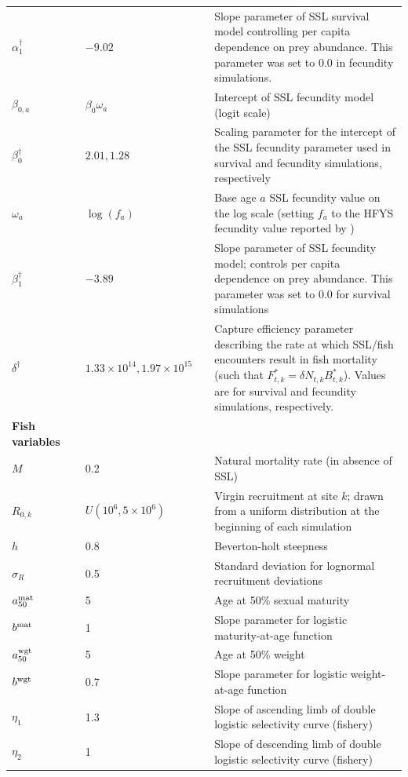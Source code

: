 \documentclass[nonumbib,leqno]{nrc1}
\begin{document}
\begin{longtable}{p{2.5cm}lp{2.5cm}l p{8cm}}
$\alpha_1^\dag$ & & $-9.02$ & & Slope parameter of SSL survival model controlling per capita dependence on prey abundance.  This parameter was set to 0.0 in fecundity simulations. \\
$\beta_{0,a}$ & & $\beta_0 \omega_a$ & & Intercept of SSL fecundity model (logit scale) \\
$\beta_0^\dag$ & & $2.01,1.28$ & & Scaling parameter for the intercept of the SSL fecundity parameter used in survival and fecundity simulations, respectively \\
$\omega_a$ & & $\log(f_a)$ & & Base age $a$ SSL fecundity value on the log scale (setting $f_a$ to the HFYS fecundity value reported by \citet{HolmesEtAl2007}) \\
$\beta_1^\dag$ & & $-3.89$ & & Slope parameter of SSL fecundity model; controls per capita dependence
                    on prey abundance.  This parameter was set to 0.0 for survival simulations \\
$\delta^\dag$ & & $1.33 \times 10^{14}, 1.97 \times 10^{15}  $ & & Capture efficiency parameter describing the rate at which SSL/fish encounters result in fish mortality (such that $F_{t,k}^*=\delta N_{t,k} B_{t,k}^*$).  Values are for survival and fecundity simulations, respectively. \\
\midrule
\multicolumn{1}{l}{\textbf{Fish variables}}  \\
$M$ & & 0.2 & & Natural mortality rate (in absence of SSL) \\ [2pt]
$R_{0,k}$ & & $U(10^6,5 \times 10^6)$ & & Virgin recruitment at site $k$; drawn from a uniform distribution at the beginning of each simulation \\
$h$ & & 0.8 & & Beverton-holt steepness \\
$\sigma_R$ & & 0.5 & & Standard deviation for lognormal recruitment deviations \\
$a_{50}^{\rm mat}$ & & 5 & & Age at 50\% sexual maturity \\
$b^{\rm mat}$ & & 1 & & Slope parameter for logistic maturity-at-age function \\
$a_{50}^{\rm wgt}$ & & 5 & & Age at 50\% weight \\
$b^{\rm wgt}$ & & 0.7 & & Slope parameter for logistic weight-at-age function \\
$\eta_1$ & & 1.3 & & Slope of ascending limb of double logistic selectivity curve (fishery)\\
$\eta_2$ & & 1 & & Slope of descending limb of double logistic selectivity curve (fishery) \\

\end{longtable}
\end{document}

